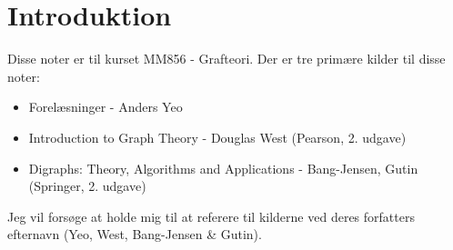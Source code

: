 \chapter{Introduktion}

Disse noter er til kurset MM856 - Grafteori. Der er tre primære kilder til disse noter:
\begin{itemize}
  \item Forelæsninger - Anders Yeo
  \item Introduction to Graph Theory - Douglas West (Pearson, 2. udgave)
  \item Digraphs: Theory, Algorithms and Applications - Bang-Jensen, Gutin (Springer, 2. udgave)
\end{itemize}

Jeg vil forsøge at holde mig til at referere til kilderne ved deres forfatters efternavn (Yeo, West, Bang-Jensen \& Gutin).
